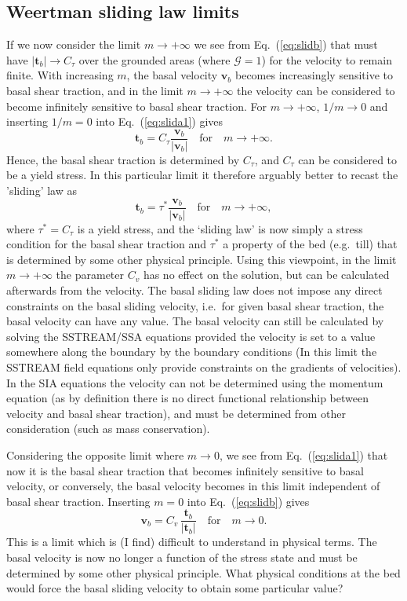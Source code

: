\documentclass[10pt,a4paper]{book}
\newcommand{\G}{\mathcal{G}}
\begin{document}
\subsection{Weertman sliding law limits}
If we now consider the limit $m \to +\infty$ we see from
Eq.~(\ref{eq:slidb}) that must have $|\bm{t}_b| \to C_{\tau}$ over the
grounded areas (where $\G=1$) for the velocity to remain finite.  With
increasing $m$, the basal velocity $\bm{v}_b$ becomes increasingly
sensitive to basal shear traction, and in the limit $m \to + \infty$
the velocity can be considered to become infinitely sensitive to basal
shear traction.  For $m \to +\infty$, $1/m \to 0$ and inserting
$1/m=0$ into Eq.~(\ref{eq:slida1}) gives
\[ 
     \bm{t}_b =  C_{\tau} \frac{\bm{v}_b}{| \bm{v}_b | }  \quad \text{for}   \quad m \to +\infty .
     \]
Hence, the basal shear traction is determined by $C_{\tau}$, and
$C_{\tau}$ can be considered to be a yield stress. In this particular
limit it therefore arguably better to recast the 'sliding' law as
\[
\bm{t}_b=  \tau^* \frac{\bm{v}_b}{| \bm{v}_b | }   \quad \text{for}   \quad m \to +\infty ,
\]
where $\tau^*=C_{\tau}$ is a yield stress, and the `sliding law' is
now simply a stress condition for the basal shear traction and
$\tau^*$ a property of the bed (e.g.\ till) that is determined by some
other physical principle.  Using this viewpoint, in the limit $m\to
+\infty$ the parameter $C_v$ has no effect on the solution, but can be
calculated afterwards from the velocity. The basal sliding law does not
impose any direct constraints on the basal sliding velocity, i.e.\ for
given basal shear traction, the basal velocity can have any value.
The basal velocity can still be calculated by solving the SSTREAM/SSA
equations provided the velocity is set to a value somewhere along the
boundary by the boundary conditions (In this limit the SSTREAM field
equations only provide constraints on the gradients of velocities). In
the SIA equations the velocity can not be determined using the
momentum equation (as by definition there is no direct functional
relationship between velocity and basal shear traction), and must be
determined from other consideration (such as mass conservation).

Considering the opposite limit where $m \to 0$, we see from Eq.~(\ref{eq:slida1})
that now it is the basal shear traction that becomes infinitely
sensitive to basal velocity, or conversely, the basal velocity becomes
in this limit independent of basal shear traction. Inserting $m=0$ into Eq.~(\ref{eq:slidb}) gives
\[
  \bm{v}_b    =  C_v  \, \frac{\bm{t}_b}{| \bm{t}_b|}   \quad \text{for}   \quad m \to 0.
\]  
This is a limit
which is (I find) difficult to understand in physical terms. The basal
velocity is now no longer a function of the stress state and must be
determined by some other physical principle. What physical conditions
at the bed would force the basal sliding velocity to obtain some
particular value?
\end{document}
